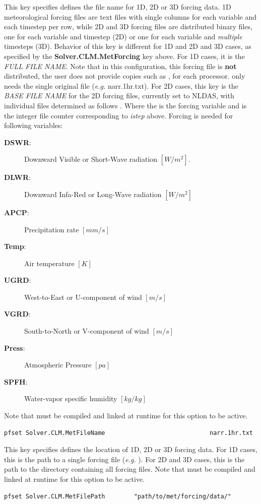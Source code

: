 {This key specifies defines the file name for 1D, 2D or 3D forcing data.  1D meteorological forcing files are text files with single columns for each variable and each timestep per row, while 2D and 3D forcing files are distributed \parflow{} binary files, one for each variable and timestep (2D) or one for each variable and \emph{multiple} timesteps (3D). Behavior of this key is different for 1D and 2D and 3D cases, as specified by the {\bf Solver.CLM.MetForcing} key above. For 1D cases, it is the {\em FULL FILE NAME}. Note that in this configuration, this forcing file is {\bf not} distributed,  the user does not provide copies such as ,  for each processor.  \parflow{} only needs the single original file ({\em e.g.} narr.1hr.txt).  For 2D cases, this key is the {\em BASE FILE NAME} for the 2D forcing files, currently set to NLDAS, with individual files determined as follows . Where the  is the forcing variable and  is the integer file counter corresponding to {\em istep} above. Forcing is needed for following variables:
\begin{description}
\item[{\bf DSWR}: ] Downward Visible or Short-Wave radiation $[W/m^2]$.
\item[{\bf DLWR}: ] Downward Infa-Red or Long-Wave radiation $[W/m^2]$
\item[{\bf APCP}: ] Precipitation rate $[mm/s]$
\item[{\bf Temp}: ] Air temperature $[K]$
\item[{\bf UGRD}: ] West-to-East or U-component of wind $[m/s]$
\item[{\bf VGRD}: ] South-to-North or V-component of wind $[m/s]$
\item[{\bf Press}: ] Atmospheric Pressure $[pa]$
\item[{\bf SPFH}: ] Water-vapor specific humidity $[kg/kg]$
\label{clm_forcing}
\end{description}
Note that  must be compiled and linked at runtime for this option to be active.
}
\begin{display}\begin{verbatim}
pfset Solver.CLM.MetFileName                             narr.1hr.txt
\end{verbatim}\end{display}

{This key specifies defines the location of 1D, 2D or 3D forcing data. For 1D cases, this is the path to a single forcing file ({\em e.g.}
). For 2D and 3D cases, this is the path to the directory
containing all forcing files. Note that  must be compiled and linked at runtime for this option to be active.
}
\begin{display}\begin{verbatim}
pfset Solver.CLM.MetFilePath		"path/to/met/forcing/data/"
\end{verbatim}\end{display}

